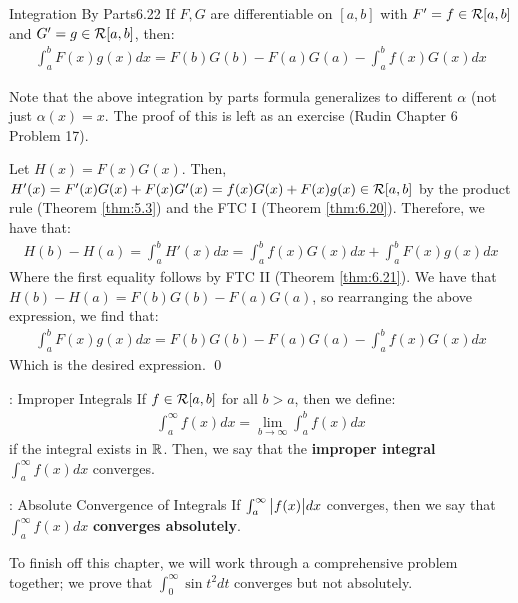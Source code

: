 \begin{theorem}{Integration By Parts}{6.22}
    If $F, G$ are differentiable on $[a, b]$ with $F' = f \in \mathcal{R}[a, b]$ and $G' = g \in \mathcal{R}[a, b]$, then:
    \begin{align*}
        \int_a^b F(x)g(x)dx = F(b)G(b) - F(a)G(a) - \int_a^b f(x)G(x)dx
    \end{align*}
\end{theorem}
\noindent Note that the above integration by parts formula generalizes to different $\alpha$ (not just $\alpha(x) = x$. The proof of this is left as an exercise (Rudin Chapter 6 Problem 17).
\begin{nproof}
    Let $H(x) = F(x)G(x)$. Then, $H'(x) = F'(x)G(x) + F(x)G'(x) = f(x)G(x) + F(x)g(x) \in \mathcal{R}[a, b]$ by the product rule (Theorem \ref{thm:5.3}) and the FTC I (Theorem \ref{thm:6.20}). Therefore, we have that:
    \begin{align*}
        H(b) - H(a) = \int_a^b H'(x)dx = \int_a^b f(x)G(x)dx + \int_a^b F(x)g(x)dx
    \end{align*}
    Where the first equality follows by FTC II (Theorem \ref{thm:6.21}). We have that $H(b) - H(a) = F(b)G(b) - F(a)G(a)$, so rearranging the above expression, we find that:
    \begin{align*}
        \int_a^b F(x)g(x)dx = F(b)G(b) - F(a)G(a) - \int_a^b f(x)G(x)dx
    \end{align*}
    Which is the desired expression. \qed
\end{nproof}

\begin{ndef}{: Improper Integrals}{}
    If $f \in \mathcal{R}[a, b]$ for all $b > a$, then we define:
    \begin{align*}
        \int_a^\infty f(x)dx = \lim_{b \rightarrow \infty}\int_a^b f(x)dx
    \end{align*}
    if the integral exists in $\mathbb{R}$. Then, we say that the \textbf{improper integral} $\int_a^\infty f(x)dx$ converges.
\end{ndef}
\begin{ndef}{: Absolute Convergence of Integrals}{}
    If $\int_a^\infty \abs{f(x)}dx$ converges, then we say that $\int_a^\infty f(x)dx$ \textbf{converges absolutely}.
\end{ndef}

\noindent To finish off this chapter, we will work through a comprehensive problem together; we prove that $\int_0^\infty \sin t^2 dt$ converges but not absolutely. 


